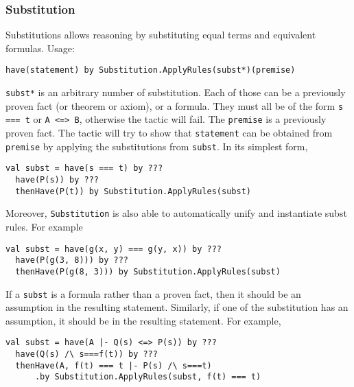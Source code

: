 \subsubsection*{Substitution}
Substitutions allows reasoning by substituting equal terms and equivalent formulas. Usage:
\begin{lstlisting}[language=lisa]
  have(statement) by Substitution.ApplyRules(subst*)(premise)
\end{lstlisting}

\lstinline|subst*| is an arbitrary number of substitution. Each of those can be a previously proven fact (or theorem or axiom), or a formula. They must all be of the form \lstinline|s === t| or \lstinline|A <=> B|, otherwise the tactic will fail. The \lstinline|premise| is a previously proven fact. The tactic will try to show that \lstinline|statement| can be obtained from \lstinline|premise| by applying the substitutions from \lstinline|subst|. In its simplest form,
\begin{lstlisting}[language=lisa]
  val subst = have(s === t) by ???
  have(P(s)) by ???
  thenHave(P(t)) by Substitution.ApplyRules(subst)
\end{lstlisting}

Moreover, \lstinline|Substitution| is also able to  automatically unify and instantiate subst rules. For example

\begin{lstlisting}[language=lisa]
  val subst = have(g(x, y) === g(y, x)) by ???
  have(P(g(3, 8))) by ???
  thenHave(P(g(8, 3))) by Substitution.ApplyRules(subst)
\end{lstlisting}

If a \lstinline|subst| is a formula rather than a proven fact, then it should be an assumption in the resulting statement. Similarly, if one of the substitution has an assumption, it should be in the resulting statement. For example,

\begin{lstlisting}[language=lisa]
  val subst = have(A |- Q(s) <=> P(s)) by ???
  have(Q(s) /\ s===f(t)) by ???
  thenHave(A, f(t) === t |- P(s) /\ s===t) 
      .by Substitution.ApplyRules(subst, f(t) === t)
\end{lstlisting}